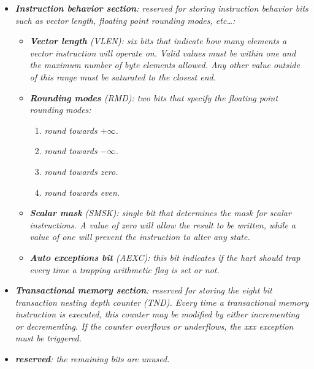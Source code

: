 \documentclass{article}
\begin{document}
\begin{itemize}
                    \item \textit{\textbf{Instruction behavior section}: reserved for storing instruction behavior bits such as vector length, floating point rounding modes, etc\ldots:}

                        \begin{itemize}

                            \item \textit{\textbf{Vector length} (VLEN): six bits that indicate how many elements a vector instruction will operate on. Valid values must be within one and the maximum number of byte elements allowed. Any other value outside of this range must be saturated to the closest end.}

                            \item \textit{\textbf{Rounding modes} (RMD): two bits that specify the floating point rounding modes:}

                                \begin{enumerate}

                                    \item \textit{round towards \(+\infty\).}
                                    \item \textit{round towards \(-\infty\).}
                                    \item \textit{round towards zero.}
                                    \item \textit{round towards even.}

                                \end{enumerate}

                            \item \textit{\textbf{Scalar mask} (SMSK): single bit that determines the mask for scalar instructions. A value of zero will allow the result to be written, while a value of one will prevent the instruction to alter any state.}

                            \item \textit{\textbf{Auto exceptions bit} (AEXC): this bit indicates if the hart should trap every time a trapping arithmetic flag is set or not.}

                        \end{itemize}

                    \item \textit{\textbf{Transactional memory section}: reserved for storing the eight bit transaction nesting depth counter (TND). Every time a transactional memory instruction is executed, this counter may be modified by either incrementing or decrementing. If the counter overflows or underflows, the xxx exception must be triggered.}

                    \item \textit{\textbf{reserved}: the remaining bits are unused.}

                \end{itemize}
\end{document}
